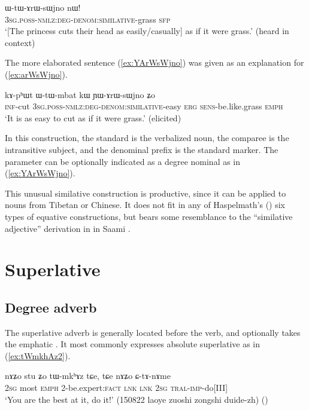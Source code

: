 \begin{exe}
	\ex \label{ex:arWsWjno}
	\gll  ɯ-tɯ-ɤrɯ-sɯjno nɯ!   \\
	\textsc{3sg}.\textsc{poss}-\textsc{nmlz}:\textsc{deg}-\textsc{denom}:\textsc{similative}-grass \textsc{sfp} \\
	\glt `[The princess cuts their head as easily/casually] as if it were grass.' (heard in context)
\end{exe}

The more elaborated sentence (\ref{ex:YArWsWjno}) was given as an explanation for (\ref{ex:arWsWjno}).

\begin{exe}
	\ex \label{ex:YArWsWjno}
	\gll  kɤ-pʰɯt ɯ-tɯ-mbat kɯ ɲɯ-ɤrɯ-sɯjno ʑo \\
	\textsc{inf}-cut  \textsc{3sg}.\textsc{poss}-\textsc{nmlz}:\textsc{deg}-\textsc{denom}:\textsc{similative}-easy \textsc{erg} \textsc{sens}-be.like.grass \textsc{emph} \\
	\glt `It is as easy to cut as if it were grass.' (elicited)
\end{exe}

In this construction, the standard is the verbalized noun, the comparee is the intransitive subject, and the denominal prefix  is the standard marker. The parameter can be optionally indicated as a degree nominal as in (\ref{ex:YArWsWjno}).

This unusual similative construction is productive, since it can be applied to nouns from Tibetan or Chinese. It does not fit in any of Haspelmath's (\citeyear{haspelmath17equative}) six types of equative constructions, but bears some resemblance to the ``similative adjective'' derivation in  in Saami \citep[5.1]{ylikovski17similarity}. 


\section{Superlative} \label{sec:superlative}

 \subsection{Degree adverb} \label{sec:stu.superlative}
The superlative adverb  is generally located before the verb, and optionally takes the emphatic . It most commonly expresses absolute superlative as in  (\ref{ex:tWmkhAz2}).
 

 \begin{exe}
\ex \label{ex:tWmkhAz2}
\gll nɤʑo stu ʑo tɯ-mkʰɤz tɕe, tɕe nɤʑo ɕ-tɤ-nɤme \\
\textsc{2sg} most \textsc{emph} 2-be.expert:\textsc{fact}   \textsc{lnk} \textsc{lnk} \textsc{2sg} \textsc{tral}-\textsc{imp}-do[III] \\
\glt `You are the best at it, do it!' (150822 laoye zuoshi zongshi duide-zh)
()
\end{exe}

